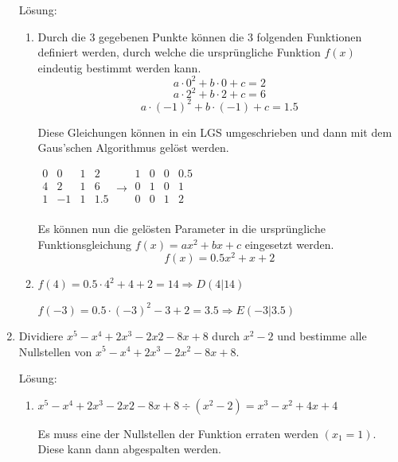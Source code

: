 \documentclass[../main.tex]{subfiles}
\begin{document}
\begin{enumerate}
	      Lösung:
	      \begin{enumerate}
		      \item Durch die \( 3 \) gegebenen Punkte können die \( 3 \) folgenden Funktionen
		            definiert werden, durch welche die ursprüngliche Funktion \( f(x) \) eindeutig bestimmt werden kann.
		            \[ a \cdot 0^2 + b \cdot 0 + c = 2 \]
		            \[ a \cdot 2^2 + b \cdot 2 + c = 6 \]
		            \[ a \cdot (-1)^2 + b \cdot (-1) + c = 1.5 \]

		            Diese Gleichungen können in ein LGS umgeschrieben und dann mit dem
		            Gaus'schen Algorithmus gelöst werden.

		            \( \begin{array}{ccc|c}
			            0 & 0  & 1 & 2   \\
			            4 & 2  & 1 & 6   \\
			            1 & -1 & 1 & 1.5 \\
		            \end{array}
		            \rightarrow
		            \begin{array}{ccc|c}
			            1 & 0 & 0 & 0.5 \\
			            0 & 1 & 0 & 1   \\
			            0 & 0 & 1 & 2   \\
		            \end{array} \)

		            Es können nun die gelösten Parameter in die ursprüngliche Funktionsgleichung
		            \( f(x) = ax^2 + bx + c \) eingesetzt werden.
		            \[ f(x) = 0.5 x^2 + x + 2 \]

		      \item \( f(4) = 0.5 \cdot 4^2 + 4 + 2 = 14  \Rightarrow D(4|14) \)

		            \( f(-3) = 0.5 \cdot (-3)^2 -3 + 2 = 3.5  \Rightarrow E(-3|3.5) \)
	      \end{enumerate}
	\item Dividiere \( x^5 - x^4 + 2x^3 -2x2 -8x +8 \) durch \( x^2 - 2 \)
	      und bestimme alle Nullstellen von \( x^5 - x^4 + 2x^3 - 2x^2 - 8x +8 \).

	      Lösung:
	      \begin{enumerate}
		      \item \( x^5 - x^4 + 2x^3 -2x2 -8x +8  \div (x^2 -2) = x^3 -x^2 + 4x +4 \)

		            Es muss eine der Nullstellen der Funktion erraten werden \( (x_1=1) \).
		            Diese kann dann abgespalten werden.


\end{enumerate}
\end{enumerate}
\end{document}
